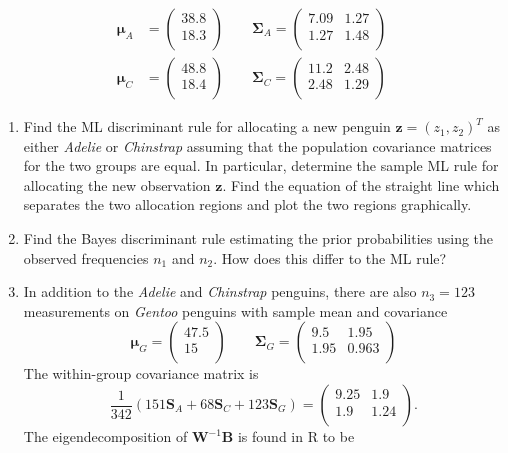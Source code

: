 \documentclass[
]{book}
\theoremstyle{definition}
\theoremstyle{definition}
\theoremstyle{definition}
\theoremstyle{definition}
\theoremstyle{remark}
\begin{document}
\begin{align*}
{\boldsymbol{\mu}}_{A}&=\begin{pmatrix}38.8 \\18.3 \\\end{pmatrix} \qquad \boldsymbol{\Sigma}_A = \begin{pmatrix}7.09&1.27 \\1.27&1.48 \\\end{pmatrix}\\
{\boldsymbol{\mu}}_{C}&=\begin{pmatrix}48.8 \\18.4 \\\end{pmatrix}\qquad \boldsymbol{\Sigma}_C = \begin{pmatrix}11.2&2.48 \\2.48&1.29 \\\end{pmatrix}
\end{align*}

\begin{enumerate}
\def\labelenumi{\roman{enumi}.}
\item
  Find the ML discriminant rule for allocating a new penguin \(\mathbf z=(z_1,z_2)^T\) as either \emph{Adelie} or \emph{Chinstrap} assuming that the population covariance matrices for the two groups are equal. In particular, determine the sample ML rule for allocating the new observation \(\mathbf z\). Find the equation of the straight line which separates the two allocation regions and plot the two regions graphically.
\item
  Find the Bayes discriminant rule estimating the prior probabilities using the observed frequencies \(n_1\) and \(n_2\). How does this differ to the ML rule?
\item
  In addition to the \emph{Adelie} and \emph{Chinstrap} penguins, there are also \(n_3=123\) measurements on \emph{Gentoo} penguins with sample mean and covariance
  \[
  {\boldsymbol{\mu}}_{G}=\begin{pmatrix}47.5 \\15 \\\end{pmatrix} \qquad \boldsymbol{\Sigma}_G = \begin{pmatrix}9.5&1.95 \\1.95&0.963 \\\end{pmatrix}\]
  The within-group covariance matrix is
  \[ \frac{1}{342}(151 \mathbf S_A + 68 \mathbf S_C + 123 \mathbf S_G) = \begin{pmatrix}9.25&1.9 \\1.9&1.24 \\\end{pmatrix}.\]
  The eigendecomposition of \(\mathbf W^{-1}\mathbf B\) is found in R to be
\end{enumerate}
\end{document}
